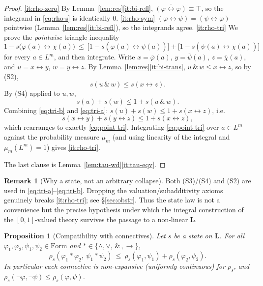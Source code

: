 \documentclass{amsart}
\theoremstyle{definition}
\newtheorem{remark}{Remark}
\theoremstyle{plain}
\newtheorem{proposition}{Proposition}
\newcommand{\bL}{\mathbf{L}}
\newcommand{\Form}{\mathrm{Form}}
\newcommand{\fto}{\rightarrow}
\newcommand{\fbi}{\leftrightarrow}
\newcommand{\odotop}{\,\&\,}
\newcommand{\Top}{\top}
\begin{document}
\begin{proof}
\eqref{it:rho-zero} By Lemma~\ref{lem:res}\eqref{it:bi-refl},
$\overline{(\varphi\fbi\varphi)}\equiv\Top$, so the integrand in \eqref{eq:rho-s}
is identically $0$.
\eqref{it:rho-sym} $\overline{(\varphi\fbi\psi)}=\overline{(\psi\fbi\varphi)}$
pointwise (Lemma~\ref{lem:res}\eqref{it:bi-refl}), so the integrands agree.
\eqref{it:rho-tri} We prove the \emph{pointwise} triangle inequality
\begin{equation}\label{eq:point-tri}
1-s\bigl(\overline\varphi(a)\fbi\overline\chi(a)\bigr)
\ \le\
\bigl[1-s(\overline\varphi(a)\fbi\overline\psi(a))\bigr]
+\bigl[1-s(\overline\psi(a)\fbi\overline\chi(a))\bigr]
\end{equation}
for every $a\in L^m$, and then integrate.  Write $x=\overline\varphi(a)$,
$y=\overline\psi(a)$, $z=\overline\chi(a)$, and $u=x\fbi y$, $w=y\fbi z$.  By
Lemma~\ref{lem:res}\eqref{it:bi-trans}, $u\odotop w\le x\fbi z$, so by (S2),
\begin{equation}\label{eq:tri-a}
s(u\odotop w)\le s(x\fbi z).
\end{equation}
By (S4) applied to $u,w$,
\begin{equation}\label{eq:tri-b}
s(u)+s(w)\le 1+s(u\odotop w).
\end{equation}
Combining \eqref{eq:tri-b} and \eqref{eq:tri-a}:
$s(u)+s(w)\le 1+s(x\fbi z)$, i.e.
\[
s(x\fbi y)+s(y\fbi z)\le 1+s(x\fbi z),
\]
which rearranges to exactly \eqref{eq:point-tri}.  Integrating \eqref{eq:point-tri}
over $a\in L^m$ against the probability measure $\mu_m$ (and using linearity of the
integral and $\mu_m(L^m)=1$) gives \eqref{it:rho-tri}.

The last clause is Lemma~\ref{lem:tau-wd}\eqref{it:tau-eqv}.
\end{proof}

\begin{remark}[Why a state, not an arbitrary collapse]\label{rem:why-state}
Both (S3)/(S4) and (S2) are used in \eqref{eq:tri-a}--\eqref{eq:tri-b}.  Dropping
the valuation/subadditivity axioms genuinely breaks \eqref{it:rho-tri}; see
\S\ref{sec:obstr}.  Thus the state law is not a convenience but the precise
hypothesis under which the integral construction of the $[0,1]$-valued theory
survives the passage to a non-linear $\bL$.
\end{remark}

\begin{proposition}[Compatibility with connectives]\label{prop:lipschitz}
Let $s$ be a state on $\bL$.  For all $\varphi_1,\varphi_2,\psi_1,\psi_2\in\Form$
and $*\in\{\wedge,\vee,\odotop,\fto\}$,
\begin{equation}\label{eq:lip}
\rho_s(\varphi_1*\varphi_2,\ \psi_1*\psi_2)\ \le\
\rho_s(\varphi_1,\psi_1)+\rho_s(\varphi_2,\psi_2).
\end{equation}
In particular each connective is non-expansive (uniformly continuous) for
$\rho_s$, and $\rho_s(\neg\varphi,\neg\psi)\le\rho_s(\varphi,\psi)$.
\end{proposition}
\end{document}
